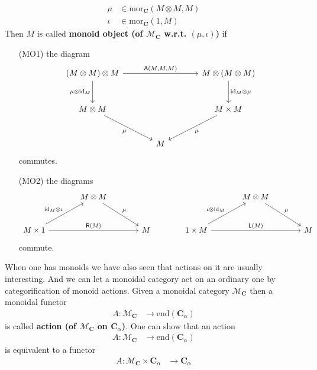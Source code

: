 \begin{align*}
  \mu
  &\in
  \mathrm{mor}_{\mathbf{C}}
  \left(
    M
    \otimes
    M,
    M
  \right)
  \\
  \iota
  &\in
  \mathrm{mor}_{\mathbf{C}}
  \left(
    1,
    M
  \right)
\end{align*}
Then $M$ is called \textbf{monoid object (of $\mathcal{M}_{\mathbf{C}}$ w.r.t. $(\mu,\iota)$)} if
\begin{enumerate}
\item[(MO1)]
the diagram
\[
\begin{tikzcd}[sep=large]
  (M \otimes M)
  \otimes
  M
  \arrow{rr}{\mathsf{A}(M,M,M)}
  \arrow[swap]{d}{\mu \otimes \mathrm{id}_{M}}
  &
  &
  M
  \otimes
  (M \otimes M)
  \arrow{d}{\mathrm{id}_{M} \otimes \mu}
  \\
  M
  \otimes
  M
  \arrow[swap]{dr}{\mu}
  &
  &
  M
  \times
  \arrow{dl}{\mu}
  M
  \\
  &
  M
  &
\end{tikzcd}
\]
commutes.
\item[(MO2)]
the diagrams
\[
\begin{tikzcd}[sep=large]
  &
  M
  \otimes
  M
  \arrow{dr}{\mu}
  &
  &
  &
  M
  \otimes
  M
  \arrow{dr}{\mu}
  &
  \\
  M
  \times
  1
  \arrow{ur}{\mathrm{id}_{M} \otimes \iota}
  \arrow{rr}{\mathsf{R}(M)}
  &
  &
  M
  &
  1
  \times
  M
  \arrow{ur}{\iota \otimes \mathrm{id}_{M}}
  \arrow{rr}{\mathsf{L}(M)}
  &
  &
  M
\end{tikzcd}
\]
commute.
\end{enumerate}
When one has monoids we have also seen that actions on it are usually interesting. And we can let a monoidal category act on an ordinary one by categorification of monoid actions. Given a monoidal category $\mathcal{M}_{\mathbf{C}}$ then a monoidal functor
\begin{align*}
  A
  \colon
  \mathcal{M}_{\mathbf{C}}
  &\rightarrow
  \mathrm{end}(\mathbf{C}_{\alpha})
\end{align*}
is called \textbf{action (of $\mathcal{M}_{\mathbf{C}}$ on $\mathbf{C}_{\alpha}$)}. One can show that an action
\begin{align*}
  A
  \colon
  \mathcal{M}_{\mathbf{C}}
  &\rightarrow
  \mathrm{end}(\mathbf{C}_{\alpha})
\end{align*}
is equivalent to a functor
\begin{align*}
  A
  \colon
  \mathcal{M}_{\mathbf{C}}
  \times
  \mathbf{C}_{\alpha}
  &\rightarrow
  \mathbf{C}_{\alpha}
\end{align*}

